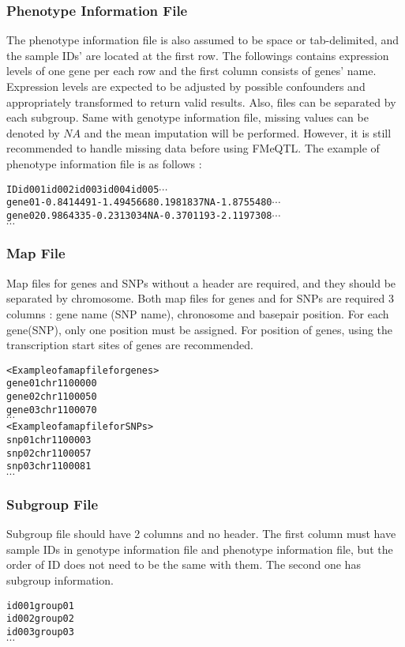 \documentclass[11pt,fleqn]{article}
\begin{document}
\subsubsection{Phenotype Information File}
 The phenotype information file is also assumed to be space or tab-delimited, and the sample IDs' are located at the first row. The followings contains expression levels of one gene per each row and the first column consists of genes' name. Expression levels are expected to be adjusted by possible confounders and appropriately transformed to return valid results. Also, files can be separated by each subgroup.
 Same with genotype information file, missing values can be denoted by $NA$ and the mean imputation will be performed. However, it is still recommended to handle missing data before using FMeQTL.
 The example of phenotype information file is as follows :
 \begin{alltt}
	ID id001 id002 id003 id004 id005 \(\cdots\)
	gene01 -0.8414491 -1.4945668  0.1981837  NA -1.8755480  \(\cdots\)
	gene02 0.9864335 -0.2313034 NA -0.3701193 -2.1197308  \(\cdots\)
	\(\cdots\)
 \end{alltt} 
\subsubsection{Map File}   
 Map files for genes and SNPs without a header are required, and they should be separated by chromosome.
 Both map files for genes and for SNPs are required 3 columns : gene name (SNP name), chronosome and basepair position. For each gene(SNP), only one position must be assigned. For position of genes, using the transcription start sites of genes are recommended.
 \begin{alltt}
<Example of a map file for genes>
	gene01 chr1 100000
	gene02 chr1 100050
	gene03 chr1 100070
	\(\cdots\)
<Example of a map file for SNPs>
	snp01 chr1 100003
	snp02 chr1 100057
	snp03 chr1 100081
	\(\cdots\)
 \end{alltt} 
\subsubsection{Subgroup File}
 Subgroup file should have 2 columns and no header. The first column must have sample IDs in genotype information file and phenotype information file, but the order of ID does not need to be the same with them. The second one has subgroup information.
 \begin{alltt}	
	id001 group01
	id002 group02
	id003 group03
	\(\cdots\)
 \end{alltt}
\end{document}
